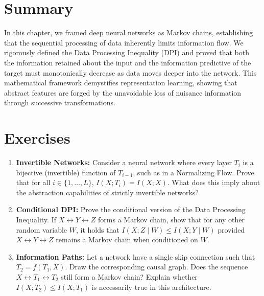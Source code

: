 \section*{Summary}
In this chapter, we framed deep neural networks as Markov chains, establishing that the sequential processing of data inherently limits information flow. We rigorously defined the Data Processing Inequality (DPI) and proved that both the information retained about the input and the information predictive of the target must monotonically decrease as data moves deeper into the network. This mathematical framework demystifies representation learning, showing that abstract features are forged by the unavoidable loss of nuisance information through successive transformations.

\section*{Exercises}
\begin{enumerate}
    \item \textbf{Invertible Networks:} Consider a neural network where every layer $T_i$ is a bijective (invertible) function of $T_{i-1}$, such as in a Normalizing Flow. Prove that for all $i \in \{1, \ldots, L\}$, $I(X; T_i) = I(X; X)$. What does this imply about the abstraction capabilities of strictly invertible networks?
    \item \textbf{Conditional DPI:} Prove the conditional version of the Data Processing Inequality. If $X \leftrightarrow Y \leftrightarrow Z$ forms a Markov chain, show that for any other random variable $W$, it holds that $I(X; Z \mid W) \le I(X; Y \mid W)$ provided $X \leftrightarrow Y \leftrightarrow Z$ remains a Markov chain when conditioned on $W$.
    \item \textbf{Information Paths:} Let a network have a single skip connection such that $T_2 = f(T_1, X)$. Draw the corresponding causal graph. Does the sequence $X \leftrightarrow T_1 \leftrightarrow T_2$ still form a Markov chain? Explain whether $I(X; T_2) \le I(X; T_1)$ is necessarily true in this architecture.
\end{enumerate}

